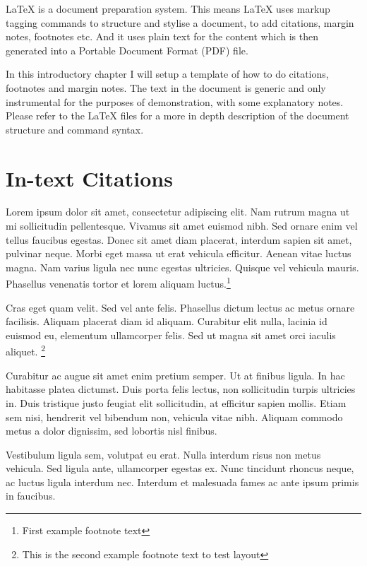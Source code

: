 LaTeX is a document preparation system. This means LaTeX uses markup tagging commands to structure and stylise a document, to add citations, margin notes, footnotes etc. And it uses plain text for the content which is then generated into a Portable Document Format (PDF) file. 

In this introductory chapter I will setup a template of how to do citations, footnotes and margin notes. The text in the document is generic and only instrumental for the purposes of demonstration, with some explanatory notes. Please refer to the LaTeX files for a more in depth description of the document structure and command syntax. 

\vspace{0.5cm}

\section{In-text Citations}

Lorem ipsum  \parencite{sennett1998corrosion} dolor sit amet, consectetur adipiscing elit. Nam rutrum magna ut mi sollicitudin pellentesque. Vivamus sit amet euismod nibh. Sed ornare enim vel tellus faucibus egestas. Donec sit amet diam placerat, interdum sapien sit amet, pulvinar neque. Morbi eget massa ut erat vehicula efficitur. Aenean vitae luctus magna. Nam varius ligula nec nunc egestas ultricies. Quisque vel vehicula mauris. Phasellus venenatis tortor et lorem aliquam luctus.\footnote{First example footnote text}

Cras eget quam velit. Sed vel ante felis. Phasellus dictum lectus ac metus ornare facilisis. Aliquam placerat diam id  aliquam. Curabitur elit nulla, lacinia id euismod eu, elementum ullamcorper felis. Sed ut magna sit amet orci iaculis aliquet.  \footnote{This is the second example footnote text to test layout}

Curabitur ac augue sit amet enim pretium semper.   Ut at finibus ligula. In hac habitasse platea dictumst. Duis porta felis lectus, non sollicitudin turpis ultricies in. Duis tristique justo feugiat elit sollicitudin, at efficitur sapien mollis. Etiam sem nisi, hendrerit vel bibendum non, vehicula vitae nibh. Aliquam commodo metus a dolor dignissim, sed lobortis nisl finibus. 

Vestibulum ligula sem, volutpat eu erat. Nulla interdum risus non metus vehicula. Sed ligula ante, ullamcorper egestas ex. Nunc tincidunt rhoncus neque, ac luctus ligula interdum nec. Interdum et malesuada fames ac ante ipsum primis in faucibus.\parencite[see][p.10]{mcguigan2014neoliberal}

